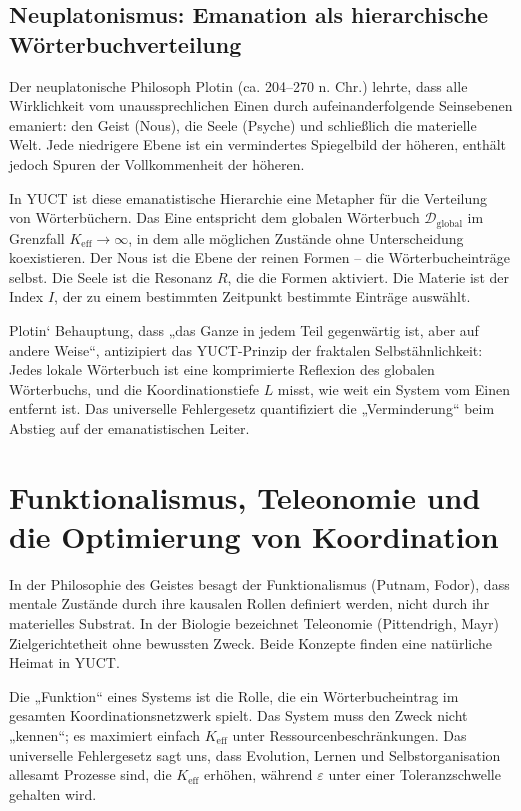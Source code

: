 \documentclass[12pt,a4paper]{article}
\begin{document}
	\subsection{Neuplatonismus: Emanation als hierarchische Wörterbuchverteilung}
	
	Der neuplatonische Philosoph Plotin (ca. 204–270 n. Chr.) lehrte, dass alle Wirklichkeit vom unaussprechlichen Einen durch aufeinanderfolgende Seinsebenen emaniert: den Geist (Nous), die Seele (Psyche) und schließlich die materielle Welt. Jede niedrigere Ebene ist ein vermindertes Spiegelbild der höheren, enthält jedoch Spuren der Vollkommenheit der höheren.
	
	In YUCT ist diese emanatistische Hierarchie eine Metapher für die Verteilung von Wörterbüchern. Das Eine entspricht dem globalen Wörterbuch \(\mathcal{D}_{\text{global}}\) im Grenzfall \(K_{\mathrm{eff}} \to \infty\), in dem alle möglichen Zustände ohne Unterscheidung koexistieren. Der Nous ist die Ebene der reinen Formen – die Wörterbucheinträge selbst. Die Seele ist die Resonanz \(R\), die die Formen aktiviert. Die Materie ist der Index \(I\), der zu einem bestimmten Zeitpunkt bestimmte Einträge auswählt.
	
	Plotin‘ Behauptung, dass „das Ganze in jedem Teil gegenwärtig ist, aber auf andere Weise“, antizipiert das YUCT-Prinzip der fraktalen Selbstähnlichkeit: Jedes lokale Wörterbuch ist eine komprimierte Reflexion des globalen Wörterbuchs, und die Koordinationstiefe \(L\) misst, wie weit ein System vom Einen entfernt ist. Das universelle Fehlergesetz quantifiziert die „Verminderung“ beim Abstieg auf der emanatistischen Leiter.
	
	\section{Funktionalismus, Teleonomie und die Optimierung von Koordination}
	
	In der Philosophie des Geistes besagt der Funktionalismus (Putnam, Fodor), dass mentale Zustände durch ihre kausalen Rollen definiert werden, nicht durch ihr materielles Substrat. In der Biologie bezeichnet Teleonomie (Pittendrigh, Mayr) Zielgerichtetheit ohne bewussten Zweck. Beide Konzepte finden eine natürliche Heimat in YUCT.
	
	Die „Funktion“ eines Systems ist die Rolle, die ein Wörterbucheintrag im gesamten Koordinationsnetzwerk spielt. Das System muss den Zweck nicht „kennen“; es maximiert einfach \(K_{\mathrm{eff}}\) unter Ressourcenbeschränkungen. Das universelle Fehlergesetz sagt uns, dass Evolution, Lernen und Selbstorganisation allesamt Prozesse sind, die \(K_{\mathrm{eff}}\) erhöhen, während \(\varepsilon\) unter einer Toleranzschwelle gehalten wird.
	
\end{document}
